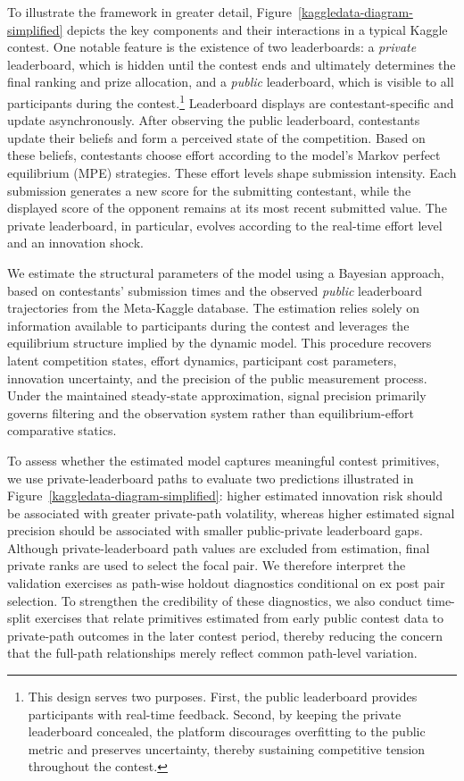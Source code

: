 \documentclass[mnsc]{informs3}
\begin{document}
To illustrate the framework in greater detail, Figure~\ref{kaggledata-diagram-simplified} depicts the key components and their interactions in a typical Kaggle contest.
One notable feature is the existence of two leaderboards: a \textit{private} leaderboard, which is hidden until the contest ends and ultimately determines the final ranking and prize allocation, and a \textit{public} leaderboard, which is visible to all participants during the contest.\footnote{
This design serves two purposes.
First, the public leaderboard provides participants with real-time feedback.
Second, by keeping the private leaderboard concealed, the platform discourages overfitting to the public metric and preserves uncertainty, thereby sustaining competitive tension throughout the contest.
}
Leaderboard displays are contestant-specific and update asynchronously.
After observing the public leaderboard, contestants update their beliefs and form a perceived state of the competition.
Based on these beliefs, contestants choose effort according to the model’s Markov perfect equilibrium (MPE) strategies.
These effort levels shape submission intensity. 
Each submission generates a new score for the submitting contestant, while the displayed score of the opponent remains at its most recent submitted value.
The private leaderboard, in particular, evolves according to the real-time effort level and an innovation shock.


We estimate the structural parameters of the model using a Bayesian approach, based on contestants’ submission times and the observed \textit{public} leaderboard trajectories from the Meta-Kaggle database.
The estimation relies solely on information available to participants during the contest and leverages the equilibrium structure implied by the dynamic model.
This procedure recovers latent competition states, effort dynamics, participant cost parameters, innovation uncertainty, and the precision of the public measurement process. Under the maintained steady-state approximation, signal precision primarily governs filtering and the observation system rather than equilibrium-effort comparative statics.


To assess whether the estimated model captures meaningful contest primitives, we use private-leaderboard paths to evaluate two predictions illustrated in Figure~\ref{kaggledata-diagram-simplified}: 
higher estimated innovation risk should be associated with greater private-path volatility, 
whereas higher estimated signal precision should be associated with smaller public-private leaderboard gaps. 
Although private-leaderboard path values are excluded from estimation, final private ranks are used to select the focal pair. We therefore interpret the validation exercises as path-wise holdout diagnostics conditional on ex post pair selection.
To strengthen the credibility of these diagnostics, we also conduct time-split exercises that relate primitives estimated from early public contest data to private-path outcomes in the later contest period, thereby reducing the concern that the full-path relationships merely reflect common path-level variation.
\end{document}
